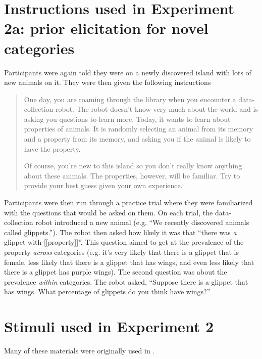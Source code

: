 \documentclass[10pt,letterpaper]{article}
\begin{document}
\section{Instructions used in Experiment 2a: prior elicitation for novel categories}
\label{sec:prior2instruct}

Participants were again told they were on a newly discovered island with lots of new animals on it. They were then given the following instructions

\begin{quote}
One day, you are roaming through the library when you encounter a data-collection robot. The robot doesn't know very much about the world and is asking you questions to learn more. Today, it wants to learn about properties of animals. It is randomly selecting an animal from its memory and a property from its memory, and asking you if the animal is likely to have the property.

Of course, you're new to this island so you don't really know anything about these animals. The properties, however, will be familiar. Try to provide your best guess given your own experience.
\end{quote}

Participants were then run through a practice trial where they were familiarized with the questions that would be asked on them. 
On each trial, the data-collection robot introduced a new animal (e.g. ``We recently discovered animals called glippets.''). 
The robot then asked how likely it was that ``there was \emph{a} glippet with [[property]]''. 
This question aimed to get at the prevalence of the property \emph{across} categories (e.g. it's very likely that there is a glippet that is female, less likely that there is a glippet that has wings, and even less likely that there is a glippet has purple wings). 
The second question was about the prevalence \emph{within} categories. The robot asked, ``Suppose there is a glippet that has wings. What percentage of glippets do you think have wings?''

\section{Stimuli used in Experiment 2}
\label{sec:materials2}

Many of these materials were originally used in .
\end{document}
